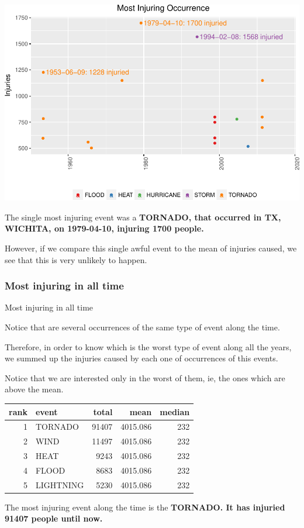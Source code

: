 \documentclass[]{article}
\begin{document}
\includegraphics{readme_files/figure-latex/injuring-single-plot-1.pdf}

The single most injuring event was a \textbf{TORNADO, that occurred in
TX, WICHITA, on 1979-04-10, injuring 1700 people.}

However, if we compare this single awful event to the mean of injuries
caused, we see that this is very unlikely to happen.

\subsubsection{Most injuring in all
time}\label{most-injuring-in-all-time}

Most injuring in all time

Notice that are several occurrences of the same type of event along the
time.

Therefore, in order to know which is the worst type of event along all
the years, we summed up the injuries caused by each one of occurrences
of this events.

Notice that we are interested only in the worst of them, ie, the ones
which are above the mean.

\begin{longtable}[]{@{}rlrrr@{}}
\toprule
rank & event & total & mean & median\tabularnewline
\midrule
\endhead
1 & TORNADO & 91407 & 4015.086 & 232\tabularnewline
2 & WIND & 11497 & 4015.086 & 232\tabularnewline
3 & HEAT & 9243 & 4015.086 & 232\tabularnewline
4 & FLOOD & 8683 & 4015.086 & 232\tabularnewline
5 & LIGHTNING & 5230 & 4015.086 & 232\tabularnewline
\bottomrule
\end{longtable}

The most injuring event along the time is the \textbf{TORNADO. It has
injuried 91407 people until now.}
\end{document}

